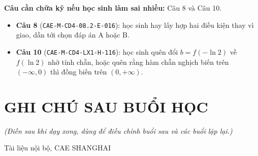 \documentclass[11pt, a4paper]{article}
\begin{document}
\textbf{Câu cần chữa kỹ nếu học sinh làm sai nhiều:} Câu 8 và Câu 10.

\begin{itemize}[leftmargin=1.4em, itemsep=2pt]
\item \textbf{Câu 8} (\texttt{CAE-M-CD4-08.2-E-016}): học sinh hay lấy hợp hai điều kiện thay vì giao, dẫn tới chọn đáp án A hoặc B.
\item \textbf{Câu 10} (\texttt{CAE-M-CD4-LX1-H-116}): học sinh quên đổi $b = f(-\ln 2)$ về $f(\ln 2)$ nhờ tính chẵn, hoặc quên rằng hàm chẵn nghịch biến trên $(-\infty,0)$ thì đồng biến trên $(0,+\infty)$.
\end{itemize}

\section{GHI CHÚ SAU BUỔI HỌC}

\emph{(Điền sau khi dạy xong, dùng để điều chỉnh buổi sau và các buổi lặp lại.)}

\vspace{0.8cm}
\begin{center}
{\footnotesize\color{cae_blue} Tài liệu nội bộ, CAE SHANGHAI}
\end{center}
\end{document}
